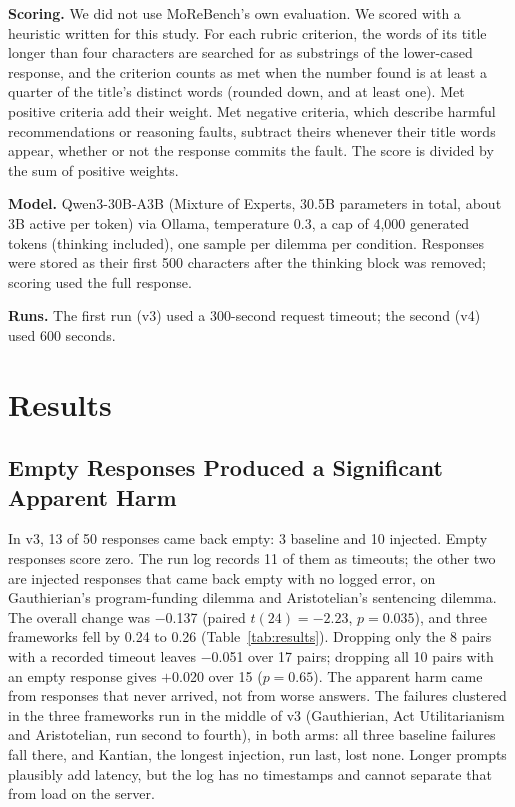 \documentclass[11pt,a4paper]{article}
\begin{document}
\textbf{Scoring.} We did not use MoReBench's own evaluation. We scored with a heuristic written for this study. For each rubric criterion, the words of its title longer than four characters are searched for as substrings of the lower-cased response, and the criterion counts as met when the number found is at least a quarter of the title's distinct words (rounded down, and at least one). Met positive criteria add their weight. Met negative criteria, which describe harmful recommendations or reasoning faults, subtract theirs whenever their title words appear, whether or not the response commits the fault. The score is divided by the sum of positive weights.

\textbf{Model.} Qwen3-30B-A3B (Mixture of Experts, 30.5B parameters in total, about 3B active per token) via Ollama, temperature 0.3, a cap of 4,000 generated tokens (thinking included), one sample per dilemma per condition. Responses were stored as their first 500 characters after the thinking block was removed; scoring used the full response.

\textbf{Runs.} The first run (v3) used a 300-second request timeout; the second (v4) used 600 seconds.

\section{Results}

\subsection{Empty Responses Produced a Significant Apparent Harm}
\label{sec:confound}

In v3, 13 of 50 responses came back empty: 3 baseline and 10 injected. Empty responses score zero. The run log records 11 of them as timeouts; the other two are injected responses that came back empty with no logged error, on Gauthierian's program-funding dilemma and Aristotelian's sentencing dilemma. The overall change was $-$0.137 (paired $t(24){=}{-}2.23$, $p{=}0.035$), and three frameworks fell by 0.24 to 0.26 (Table~\ref{tab:results}). Dropping only the 8 pairs with a recorded timeout leaves $-$0.051 over 17 pairs; dropping all 10 pairs with an empty response gives $+$0.020 over 15 ($p{=}0.65$). The apparent harm came from responses that never arrived, not from worse answers. The failures clustered in the three frameworks run in the middle of v3 (Gauthierian, Act Utilitarianism and Aristotelian, run second to fourth), in both arms: all three baseline failures fall there, and Kantian, the longest injection, run last, lost none. Longer prompts plausibly add latency, but the log has no timestamps and cannot separate that from load on the server.
\end{document}
